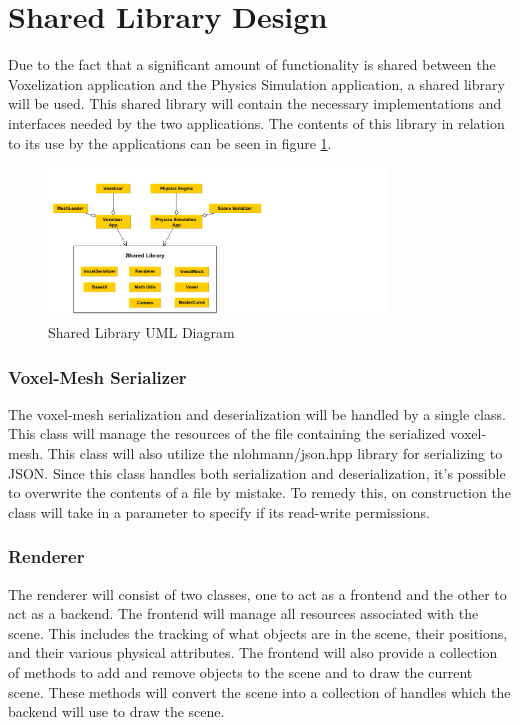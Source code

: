 \section{Shared Library Design} \label{SharedLibrary}

Due to the fact that a significant amount of functionality is shared between the Voxelization
application and the Physics Simulation application, a shared library will be used. This shared
library will contain the necessary implementations and interfaces needed by the two applications. 
The contents of this library in relation to its use by the applications can be seen in figure
\ref{fig:SharedLibraryUML}.

\begin{figure}[h]
  \centering
  \includegraphics[width=0.8\textwidth, trim={0cm 0cm 15cm 0cm}]{SharedLibraryUML}
  \caption{Shared Library UML Diagram}
  \label{fig:SharedLibraryUML}
\end{figure}

\subsubsection{Voxel-Mesh Serializer}
The voxel-mesh serialization and deserialization will be handled by a single class. This class will
manage the resources of the file containing the serialized voxel-mesh. 
This class will also utilize the nlohmann/json.hpp library for serializing to JSON.
Since this class handles both serialization and deserialization, it's possible to overwrite the 
contents of a file by mistake. To remedy this, on construction the class will take in a parameter to 
specify if its read-write permissions. 

\subsubsection{Renderer}

The renderer will consist of two classes, one to act as a frontend and the other to act as a
backend. The frontend will manage all resources associated with the scene. This includes the 
tracking of what objects are in the scene, their positions, and their various physical attributes.
The frontend will also provide a collection of methods to add and remove objects to the scene and to 
draw the current scene. These methods will convert the scene into a collection of handles which the
backend will use to draw the scene.

